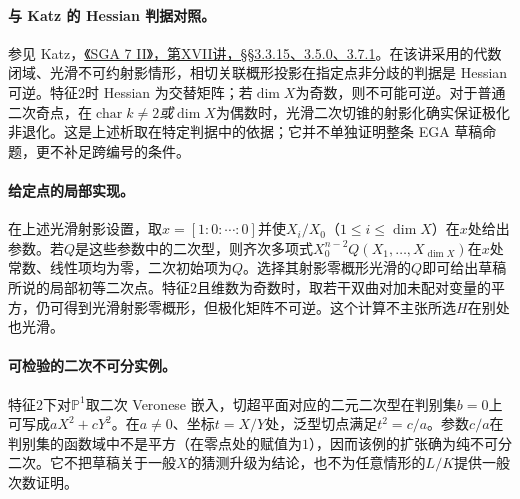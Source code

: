 \documentclass[openany,fontset=fandol]{ctexbook}
\begin{document}
\paragraph{与 Katz 的 Hessian 判据对照。}
参见 Katz，\href{https://grothendiecksga.com/read/sga7/fr/17-3.html}{《SGA 7 II》，第XVII讲，§§3.3.15、3.5.0、3.7.1}。在该讲采用的代数闭域、光滑不可约射影情形，相切关联概形投影在指定点非分歧的判据是 Hessian 可逆。特征$2$时 Hessian 为交替矩阵；若$\dim X$为奇数，则不可能可逆。对于普通二次奇点，在$\operatorname{char}k\ne2$\emph{或}$\dim X$为偶数时，光滑二次切锥的射影化确实保证极化非退化。这是上述析取在特定判据中的依据；它并不单独证明整条 EGA 草稿命题，更不补足跨编号的条件。

\paragraph{给定点的局部实现。}
在上述光滑射影设置，取$x=[1:0:\cdots:0]$并使$X_i/X_0$（$1\le i\le \dim X$）在$x$处给出参数。若$Q$是这些参数中的二次型，则齐次多项式$X_0^{n-2}Q(X_1,\ldots,X_{\dim X})$在$x$处常数、线性项均为零，二次初始项为$Q$。选择其射影零概形光滑的$Q$即可给出草稿所说的局部初等二次点。特征$2$且维数为奇数时，取若干双曲对加未配对变量的平方，仍可得到光滑射影零概形，但极化矩阵不可逆。这个计算不主张所选$H$在别处也光滑。

\paragraph{可检验的二次不可分实例。}
特征$2$下对$\mathbb P^1$取二次 Veronese 嵌入，切超平面对应的二元二次型在判别集$b=0$上可写成$aX^2+cY^2$。在$a\ne0$、坐标$t=X/Y$处，泛型切点满足$t^2=c/a$。参数$c/a$在判别集的函数域中不是平方（在零点处的赋值为$1$），因而该例的扩张确为纯不可分二次。它不把草稿关于一般$X$的猜测升级为结论，也不为任意情形的$L/K$提供一般次数证明。
\end{document}

